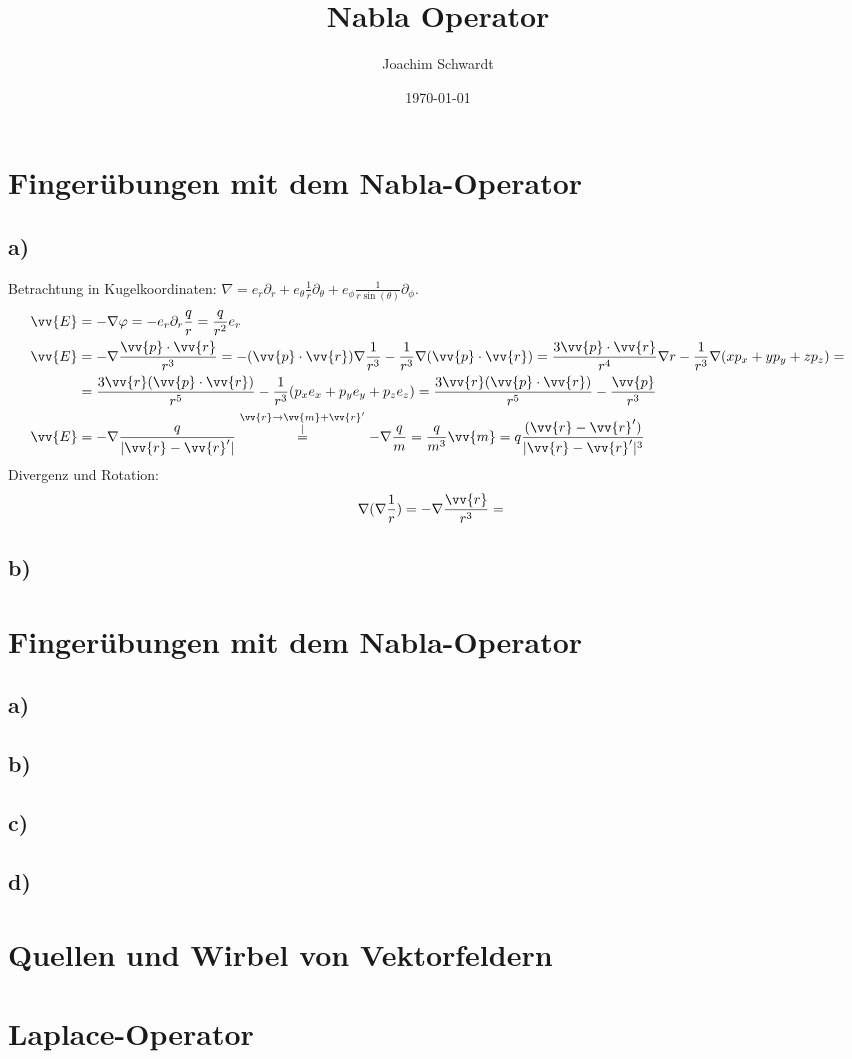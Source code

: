 \documentclass[a4paper,12pt]{article}
\begin{document}
\title{Nabla Operator}
\author{Joachim Schwardt}
\date{\today}
\maketitle

\section{Fingerübungen mit dem Nabla-Operator}
\subsection*{a)} Betrachtung in Kugelkoordinaten: $\nabla = e_r\partial_r+e_\theta\frac{1}{r}\partial_\theta+e_\phi\frac{1}{r\sin(\theta)}\partial_\phi$.
\begin{align*}
\vv{E}&=-\nabla \varphi=-e_r\partial_r\frac{q}{r}=\frac{q}{r^2}e_r \\
\vv{E}&=-\nabla \frac{\vv{p}\cdot \vv{r}}{r^3}=-(\vv{p}\cdot\vv{r})\nabla\frac{1}{r^3}-\frac{1}{r^3}\nabla (\vv{p}\cdot\vv{r})=\frac{3\vv{p}\cdot\vv{r}}{r^4}\nabla r-\frac{1}{r^3}\nabla(xp_x+yp_y+zp_z)= \\
&=\frac{3\vv{r}(\vv{p}\cdot\vv{r})}{r^5}-\frac{1}{r^3}(p_xe_x+p_ye_y+p_ze_z)=\frac{3\vv{r}(\vv{p}\cdot\vv{r})}{r^5}-\frac{\vv{p}}{r^3} \\
\vv{E}&=-\nabla\frac{q}{|\vv{r}-\vv{r}'|}\overset{\substack{\vv{r}\rightarrow\vv{m}+\vv{r}'\\|}}{=}-\nabla\frac{q}{m}=\frac{q}{m^3}\vv{m}=q\frac{(\vv{r}-\vv{r}')}{|\vv{r}-\vv{r}'|^3}
\end{align*}Divergenz und Rotation:
\begin{align*}
\nabla(\nabla\frac{1}{r})&=-\nabla\frac{\vv{r}}{r^3}=
\end{align*}
\subsection*{b)}
\section{Fingerübungen mit dem Nabla-Operator}
\subsection*{a)}
\subsection*{b)}
\subsection*{c)}
\subsection*{d)}
\section{Quellen und Wirbel von Vektorfeldern}
\section{Laplace-Operator}
\end{document}

